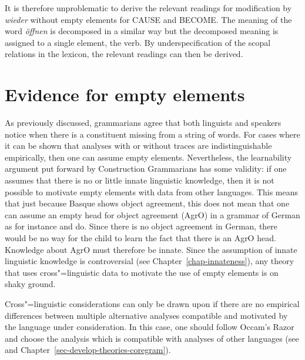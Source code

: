 It is therefore unproblematic to derive the relevant readings for modification by \emph{wieder}
without empty elements for CAUSE and BECOME. The meaning of the word \emph{öffnen} is decomposed in a similar way but the
decomposed meaning is assigned to a single element, the verb. By underspecification of the scopal
relations in the lexicon, the relevant readings can then be derived. 



\section{Evidence for empty elements}
\label{Abschnitt-Evidenz-leere-Elemente}

As previously discussed, grammarians agree that both linguists and speakers notice when there is a constituent missing from a
string of words. For cases where it can be shown that analyses with or without traces are indistinguishable empirically,
then one can assume empty elements. Nevertheless, the learnability argument put forward by
Construction Grammarians has some validity: if one assumes that there is no or little innate linguistic knowledge, then it is not possible to motivate empty elements
with data from other languages. This means that just because Basque shows object agreement,
this does not mean that one can assume an empty head for object agreement
(AgrO) in a grammar of German as
for instance \citet{Stechow96a} and \citet{Meinunger2000a} do. Since there is no object agreement in German, there
would be no way for the child to learn the fact that there is an AgrO head. Knowledge about AgrO
must therefore be innate. Since the assumption of innate linguistic knowledge is controversial (see
Chapter~\ref{chap-innateness}), any theory that uses cross"=linguistic data to motivate the use of empty elements is on shaky ground.

Cross"=linguistic considerations can only be drawn upon if there are no empirical differences between multiple alternative
analyses compatible and motivated by the language under consideration. In this case, one should follow Occam's Razor and choose the analysis which is compatible with analyses of
other languages (see \citealp{MuellerCoreGram} and Chapter~\ref{sec-develop-theories-coregram}).



